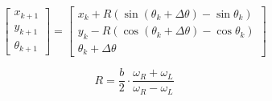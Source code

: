 \documentclass[11pt]{article}
\begin{document}
\begin{equation}
\begin{bmatrix}
x_{k+1} \\
y_{k+1} \\
\theta_{k+1}
\end{bmatrix}
=
\begin{bmatrix}
x_k + R\left(\sin(\theta_k + \Delta\theta) - \sin\theta_k\right) \\
y_k - R\left(\cos(\theta_k + \Delta\theta) - \cos\theta_k\right) \\
\theta_k + \Delta\theta
\end{bmatrix}
\end{equation}

\begin{equation}
R = \frac{b}{2} \cdot \frac{\omega_R + \omega_L}{\omega_R - \omega_L}
\end{equation}
\end{document}
